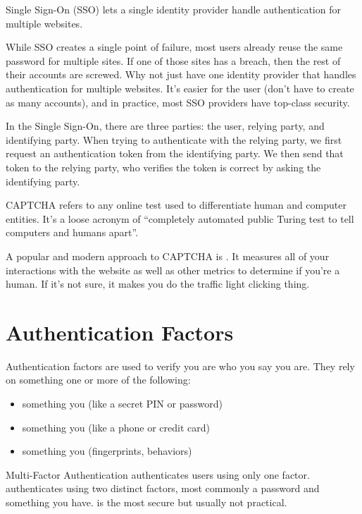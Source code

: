 \documentclass[12pt]{report}
\begin{document}
\begin{dfnbox}{Single Sign-On (SSO)}{}
     lets a single identity provider handle authentication for multiple websites.
\end{dfnbox}

While SSO creates a single point of failure, most users already reuse the same password for multiple sites. If one of those sites has a breach, then the rest of their accounts are screwed. Why not just have one identity provider that handles authentication for multiple websites. It's easier for the user (don't have to create as many accounts), and in practice, most SSO providers have top-class security.

In the Single Sign-On, there are three parties: the user, relying party, and identifying party. When trying to authenticate with the relying party, we first request an authentication token from the identifying party. We then send that token to the relying party, who verifies the token is correct by asking the identifying party.


\begin{dfnbox}{CAPTCHA}{}
     refers to any online test used to differentiate human and computer entities. It's a loose acronym of ``completely automated public Turing test to tell computers and humans apart''.
\end{dfnbox}

A popular and modern approach to CAPTCHA is . It measures all of your interactions with the website as well as other metrics to determine if you're a human. If it's not sure, it makes you do the traffic light clicking thing.


\section{Authentication Factors}
Authentication factors are used to verify you are who you say you are. They rely on something one or more of the following:
\begin{itemize}[noitemsep]
    \item something you  (like a secret PIN or password)
    \item something you  (like a phone or credit card)
    \item something you  (fingerprints, behaviors)
\end{itemize}

\begin{dfnbox}{Multi-Factor Authentication}{}
     authenticates users using only one factor.  authenticates using two distinct factors, most commonly a password and something you have.  is the most secure but usually not practical.
\end{dfnbox}
\end{document}
